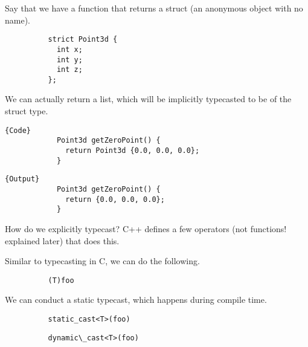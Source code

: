 \documentclass{article}
\begin{document}
      \begin{lemma}
        Say that we have a function that returns a struct (an anonymous object with no name). 
        \begin{lstlisting}
          strict Point3d {
            int x; 
            int y; 
            int z; 
          };
        \end{lstlisting}

        We can actually return a list, which will be implicitly typecasted to be of the struct type. 

        \noindent\begin{minipage}{.5\textwidth}
          \begin{lstlisting}[]{Code}
            Point3d getZeroPoint() {
              return Point3d {0.0, 0.0, 0.0}; 
            }
          \end{lstlisting}
          \end{minipage}
          \hfill
          \begin{minipage}{.49\textwidth}
          \begin{lstlisting}[]{Output}
            Point3d getZeroPoint() {
              return {0.0, 0.0, 0.0}; 
            }
          \end{lstlisting}
        \end{minipage}
      \end{lemma}

      How do we explicitly typecast? C++ defines a few operators (not functions! explained later) that does this. 

      \begin{definition}
        Similar to typecasting in C, we can do the following. 
        \begin{lstlisting}
          (T)foo
        \end{lstlisting}
      \end{definition}
      
      \begin{definition}
        We can conduct a static typecast, which happens during compile time. 
        \begin{lstlisting}
          static_cast<T>(foo)
        \end{lstlisting}
      \end{definition}

      \begin{definition}
        \begin{lstlisting}
          dynamic\_cast<T>(foo)
        \end{lstlisting}
      \end{definition}
\end{document}

